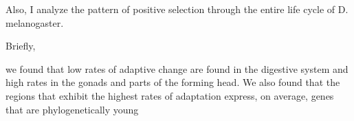 Also, I analyze the pattern of positive selection through the entire life cycle of D. melanogaster.

Briefly, 

we found that low rates of adaptive change are found in the digestive system and high rates in the gonads and parts of the forming head. We also found that the regions that exhibit the highest rates of adaptation express, on average, genes that are phylogenetically young